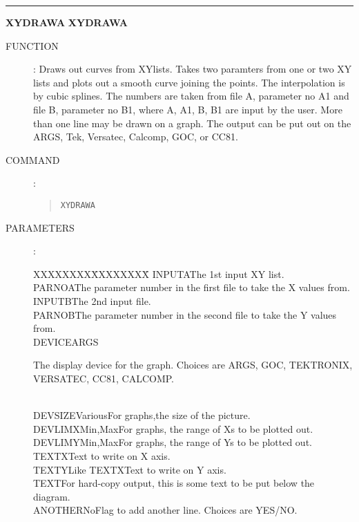 \goodbreak
\rule{\textwidth}{0.3mm}
{\Large {\bf XYDRAWA} \hfill {\bf XYDRAWA}}
\begin{description}
\item [FUNCTION]:
Draws out curves from XYlists.
Takes two paramters from one or two XY lists and plots out a smooth curve
joining the points.
The interpolation is by cubic splines.
The numbers are taken from file A, parameter no A1 and file B, parameter no B1,
where A, A1, B, B1 are input by the user.
More than one line may be drawn on a graph.
The output can be put out on the ARGS, Tek, Versatec, Calcomp, GOC, or CC81.
\item [COMMAND]:
\begin{quote}
{\tt XYDRAWA}
\end{quote}
\item [PARAMETERS] :
\begin{tabbing}
XXXXXXXX\=XXXXXXXX\=\kill
INPUTA\>\>The 1st input XY list.\\
PARNOA\>\>The parameter number in the first file to take the X values from.\\
INPUTB\>\>The 2nd input file.\\
PARNOB\>\>The parameter number in the second file to take the Y values from.\\
DEVICE\>ARGS\>\begin{minipage}[t]{100mm}
The display device for the graph.
Choices are ARGS, GOC, TEKTRONIX, VERSATEC, CC81, CALCOMP.
\end{minipage}\\
DEVSIZE\>Various\>For graphs,the size of the picture.\\
DEVLIMX\>Min,Max\>For graphs, the range of Xs to be plotted out.\\
DEVLIMY\>Min,Max\>For graphs, the range of Ys to be plotted out.\\
TEXTX\>\>Text to write on X axis.\\
TEXTY\>Like TEXTX\>Text to write on Y axis.\\
TEXT\>\>For hard-copy output, this is some text to be put below the diagram.\\
ANOTHER\>No\>Flag to add another line. Choices are YES/NO.
\end{tabbing}
\end{description}

